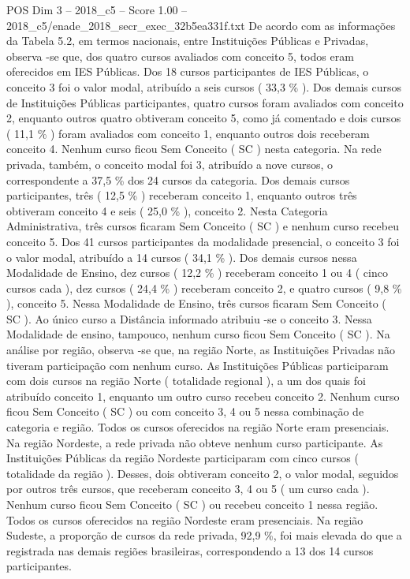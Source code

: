 \begin{textsample}{POS Dim 3 – 2018\_c5 – Score 1.00 – 2018\_c5/enade\_2018\_secr\_exec\_32b5ea331f.txt}
De acordo com as informações da Tabela 5.2, em termos nacionais, entre Instituições Públicas e Privadas, observa -se que, dos quatro cursos avaliados com conceito 5, todos eram oferecidos em IES Públicas.
Dos 18 cursos participantes de IES Públicas, o conceito 3 foi o valor modal, atribuído a seis cursos ( 33,3 \% ).
Dos demais cursos de Instituições Públicas participantes, quatro cursos foram avaliados com conceito 2, enquanto outros quatro obtiveram conceito 5, como já comentado e dois cursos ( 11,1 \% ) foram avaliados com conceito 1, enquanto outros dois receberam conceito 4.
Nenhum curso ficou Sem Conceito ( SC ) nesta categoria.
Na rede privada, também, o conceito modal foi 3, atribuído a nove cursos, o correspondente a 37,5 \% dos 24 cursos da categoria.
Dos demais cursos participantes, três ( 12,5 \% ) receberam conceito 1, enquanto outros três obtiveram conceito 4 e seis ( 25,0 \% ), conceito 2.
Nesta Categoria Administrativa, três cursos ficaram Sem Conceito ( SC ) e nenhum curso recebeu conceito 5.
Dos 41 cursos participantes da modalidade presencial, o conceito 3 foi o valor modal, atribuído a 14 cursos ( 34,1 \% ).
Dos demais cursos nessa Modalidade de Ensino, dez cursos ( 12,2 \% ) receberam conceito 1 ou 4 ( cinco cursos cada ), dez cursos ( 24,4 \% ) receberam conceito 2, e quatro cursos ( 9,8 \% ), conceito 5.
Nessa Modalidade de Ensino, três cursos ficaram Sem Conceito ( SC ).
Ao único curso a Distância informado atribuiu -se o conceito 3.
Nessa Modalidade de ensino, tampouco, nenhum curso ficou Sem Conceito ( SC ).
Na análise por região, observa -se que, na região Norte, as Instituições Privadas não tiveram participação com nenhum curso.
As Instituições Públicas participaram com dois cursos na região Norte ( totalidade regional ), a um dos quais foi atribuído conceito 1, enquanto um outro curso recebeu conceito 2.
Nenhum curso ficou Sem Conceito ( SC ) ou com conceito 3, 4 ou 5 nessa combinação de categoria e região.
Todos os cursos oferecidos na região Norte eram presenciais.
Na região Nordeste, a rede privada não obteve nenhum curso participante.
As Instituições Públicas da região Nordeste participaram com cinco cursos ( totalidade da região ).
Desses, dois obtiveram conceito 2, o valor modal, seguidos por outros três cursos, que receberam conceito 3, 4 ou 5 ( um curso cada ).
Nenhum curso ficou Sem Conceito ( SC ) ou recebeu conceito 1 nessa região.
Todos os cursos oferecidos na região Nordeste eram presenciais.
Na região Sudeste, a proporção de cursos da rede privada, 92,9 \%, foi mais elevada do que a registrada nas demais regiões brasileiras, correspondendo a 13 dos 14 cursos participantes.

\end{textsample}
